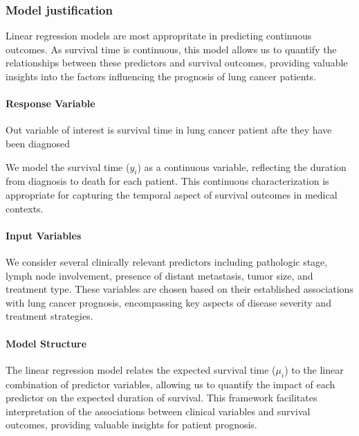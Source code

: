 \documentclass[
  letterpaper,
  DIV=11,
  numbers=noendperiod]{scrartcl}
\let\oldparagraph\paragraph
\renewcommand{\paragraph}[1]{\oldparagraph{#1}\mbox{}}
\begin{document}
\hypertarget{model-justification}{%
\subsubsection{Model justification}\label{model-justification}}

Linear regression models are most appropritate in predicting continuous
outcomes. As survival time is continuous, this model allows us to
quantify the relationships between these predictors and survival
outcomes, providing valuable insights into the factors influencing the
prognosis of lung cancer patients.

\hypertarget{response-variable}{%
\paragraph{Response Variable}\label{response-variable}}

Out variable of interest is survival time in lung cancer patient afte
they have been diagnosed

We model the survival time (\(y_i\)) as a continuous variable,
reflecting the duration from diagnosis to death for each patient. This
continuous characterization is appropriate for capturing the temporal
aspect of survival outcomes in medical contexts.

\hypertarget{input-variables}{%
\paragraph{Input Variables}\label{input-variables}}

We consider several clinically relevant predictors including pathologic
stage, lymph node involvement, presence of distant metastasis, tumor
size, and treatment type. These variables are chosen based on their
established associations with lung cancer prognosis, encompassing key
aspects of disease severity and treatment strategies.

\hypertarget{model-structure}{%
\paragraph{Model Structure}\label{model-structure}}

The linear regression model relates the expected survival time (\(μ_i\))
to the linear combination of predictor variables, allowing us to
quantify the impact of each predictor on the expected duration of
survival. This framework facilitates interpretation of the associations
between clinical variables and survival outcomes, providing valuable
insights for patient prognosis.
\end{document}

